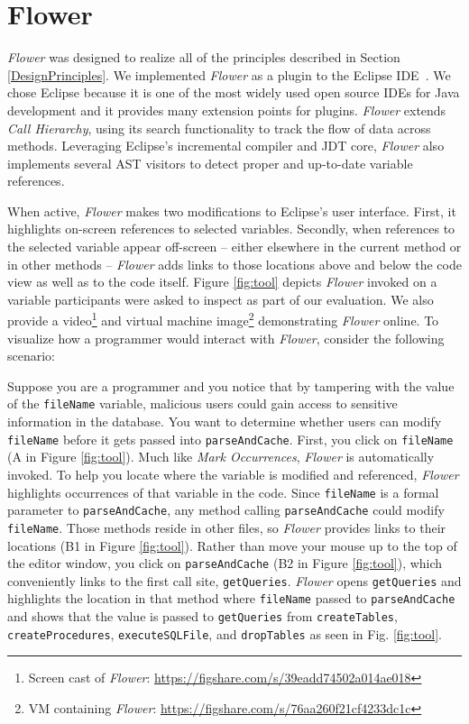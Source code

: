 \documentclass[conference]{IEEEtran}
\begin{document}
\section{Flower}
\textit{Flower} was designed to realize all of the principles described in Section \ref{DesignPrinciples}. 
We implemented \textit{Flower} as a plugin to the Eclipse IDE~\cite{Eclipse}. 
We chose Eclipse because it is one of the most widely used open source IDEs for Java development and it provides many extension points for plugins. 
\textit{Flower} extends \emph{Call Hierarchy}, using its search functionality to track the flow of data across methods. 
Leveraging Eclipse's incremental compiler and JDT core, \textit{Flower} also implements several AST visitors to detect proper and up-to-date variable references.

When active, \textit{Flower} makes two modifications to Eclipse's user interface. 
First, it highlights on-screen references to selected variables.
Secondly, when references to the selected variable appear off-screen -- either elsewhere in the current method or in other methods -- \textit{Flower} adds links to those locations above and below the code view as well as to the code itself. 
Figure \ref{fig:tool} depicts \textit{Flower} invoked on a variable participants were asked to inspect as part of our evaluation. We also provide a 
video\footnote{Screen cast of \textit{Flower}: \url{https://figshare.com/s/39eadd74502a014ae018}} 
and virtual machine 
image\footnote{VM containing \textit{Flower}: \url{https://figshare.com/s/76aa260f21cf4233dc1c}}
demonstrating \textit{Flower} online.
To visualize how a programmer would interact with \textit{Flower}, consider the following scenario:

Suppose you are a programmer and you notice that by tampering with the value of the \texttt{fileName} variable, malicious users could gain access to sensitive information in the database. 
You want to determine whether users can modify \texttt{fileName} before it gets passed into \texttt{parseAndCache}. 
First, you click on \texttt{fileName} (A in Figure \ref{fig:tool}).
Much like \emph{Mark Occurrences}, \textit{Flower} is automatically invoked.
To help you locate where the variable is modified and referenced, \textit{Flower} highlights occurrences of that variable in the code.
Since \texttt{fileName} is a formal parameter to \texttt{parseAndCache}, any method calling \texttt{parseAndCache} could modify \texttt{fileName}. 
Those methods reside in other files, so \textit{Flower} provides links to their locations (B1 in Figure \ref{fig:tool}).
Rather than move your mouse up to the top of the editor window, you click on \texttt{parseAndCache} (B2 in Figure \ref{fig:tool}), which conveniently links to the first call site, \texttt{getQueries}. 
\textit{Flower} opens \texttt{getQueries} and highlights the location in that method where \texttt{fileName} passed to \texttt{parseAndCache} and shows that the value is passed to \texttt{getQueries} from \texttt{createTables}, \texttt{createProcedures}, \texttt{executeSQLFile}, and \texttt{dropTables} as seen in Fig. \ref{fig:tool}.  
\end{document}
